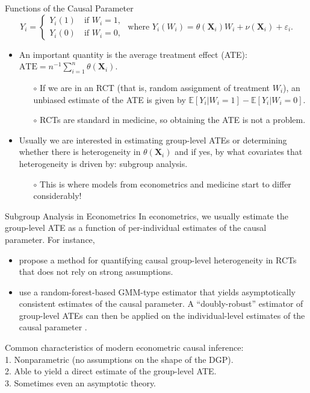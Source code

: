\documentclass[11pt]{beamer}
\begin{document}
\begin{frame}{Functions of the Causal Parameter}
\[
Y_i = 
\begin{cases}
	 Y_i(1) \quad \text{if } W_i=1,\\
	 Y_i(0) \quad \text{if } W_i=0, 
	 \end{cases}
	 \text{ where }
Y_i(W_i) = \theta(\mathbf{X}_i) W_i + \nu(\mathbf{X}_i) + \varepsilon_i.
\]
\begin{itemize}
	\item An important quantity is the \alert{average treatment effect} (ATE): $\text{ATE} = n^{-1} \sum_{i=1}^n \theta(\mathbf{X}_i)$.
	\begin{itemize}
	\item[$\circ$] If we are in an RCT (that is, random assignment of treatment $W_i$), an unbiased estimate of the ATE is given by 
	$\mathbb{E}[Y_i | W_i=1 ] - \mathbb{E}[Y_i | W_i=0]$.
	\item[$\circ$] RCTs are standard in medicine, so obtaining the ATE is not a problem.
	\end{itemize}
	\item Usually we are interested in estimating group-level ATEs or determining whether there is heterogeneity in $\theta(\mathbf{X}_i)$ and if yes, by what covariates that heterogeneity is driven by: \alert{subgroup analysis}.
	\begin{itemize}
		\item[$\circ$] This is where models from econometrics and medicine start to differ considerably!
	\end{itemize}
\end{itemize}
\end{frame}


\begin{frame}{Subgroup Analysis in Econometrics}
In econometrics, we usually estimate the group-level ATE as a function of per-individual estimates of the causal parameter. For instance,
\begin{itemize}
	\item \cite{chernozhukov2018generic} propose a method for quantifying causal group-level heterogeneity in RCTs that does not rely on strong assumptions.
	\item \cite{athey2019grf} use a random-forest-based GMM-type estimator that yields asymptotically consistent estimates of the causal parameter. A ``doubly-robust'' estimator of group-level ATEs can then be applied on the individual-level estimates of the causal parameter \citep{athey2019grf-appl}. 
\end{itemize}
\alert{Common characteristics of modern econometric causal inference}: \\ 1. Nonparametric (no assumptions on the  shape of the DGP). \\ 2. Able to yield a direct estimate of the group-level ATE. \\
3. Sometimes even an asymptotic theory.
\end{frame}
\end{document}
